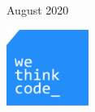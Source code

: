 \begin{titlepage}
	
	\vfill\vfill\vfill %
	
	\large{August 2020}\\ %
	
	
	\vfill\vfill
	
	\includegraphics[width=0.2\textwidth]{0.title/index.png}\\[1cm] %
	
	\vfill %
	
\end{titlepage}


%
